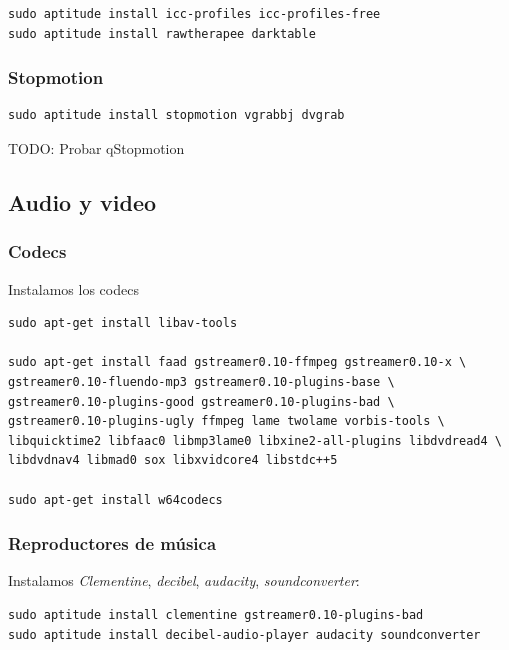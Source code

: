 \documentclass[12pt,spanish,]{scrartcl}
\begin{document}
\begin{verbatim}
sudo aptitude install icc-profiles icc-profiles-free
sudo aptitude install rawtherapee darktable
\end{verbatim}

\subsubsection{Stopmotion}\label{stopmotion}

\begin{verbatim}
sudo aptitude install stopmotion vgrabbj dvgrab
\end{verbatim}

TODO: Probar qStopmotion

\subsection{Audio y video}\label{audio-y-video}

\subsubsection{Codecs}\label{codecs}

Instalamos los codecs

\begin{verbatim}
sudo apt-get install libav-tools

sudo apt-get install faad gstreamer0.10-ffmpeg gstreamer0.10-x \
gstreamer0.10-fluendo-mp3 gstreamer0.10-plugins-base \
gstreamer0.10-plugins-good gstreamer0.10-plugins-bad \
gstreamer0.10-plugins-ugly ffmpeg lame twolame vorbis-tools \
libquicktime2 libfaac0 libmp3lame0 libxine2-all-plugins libdvdread4 \
libdvdnav4 libmad0 sox libxvidcore4 libstdc++5

sudo apt-get install w64codecs
\end{verbatim}

\subsubsection{Reproductores de
música}\label{reproductores-de-muxfasica}

Instalamos \emph{Clementine}, \emph{decibel}, \emph{audacity},
\emph{soundconverter}:

\begin{verbatim}
sudo aptitude install clementine gstreamer0.10-plugins-bad
sudo aptitude install decibel-audio-player audacity soundconverter
\end{verbatim}
\end{document}
